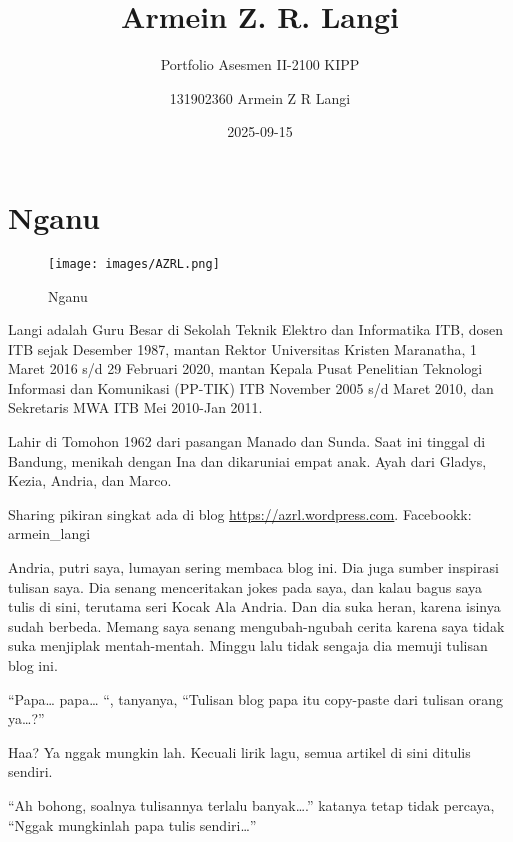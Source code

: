 \documentclass[
  letterpaper,
  DIV=11,
  numbers=noendperiod]{scrreprt}
\title{Armein Z. R. Langi}
\subtitle{Portfolio Asesmen II-2100 KIPP}
\author{131902360 Armein Z R Langi}
\date{2025-09-15}
\renewcommand*\contentsname{Table of contents}
\newcommand\contentsname{Table of contents}
\begin{document}
\maketitle

\renewcommand*\contentsname{Table of contents}
{
\hypersetup{linkcolor=}
\setcounter{tocdepth}{2}
\tableofcontents
}

\chapter*{Nganu}\label{nganu}


\begin{figure}[H]

{\centering \texttt{[image: images/AZRL.png]}

}

\caption{Nganu}

\end{figure}%

Langi adalah Guru Besar di Sekolah Teknik Elektro dan Informatika ITB,
dosen ITB sejak Desember 1987, mantan Rektor Universitas Kristen
Maranatha, 1 Maret 2016 s/d 29 Februari 2020, mantan Kepala Pusat
Penelitian Teknologi Informasi dan Komunikasi (PP-TIK) ITB November 2005
s/d Maret 2010, dan Sekretaris MWA ITB Mei 2010-Jan 2011.

Lahir di Tomohon 1962 dari pasangan Manado dan Sunda. Saat ini tinggal
di Bandung, menikah dengan Ina dan dikaruniai empat anak. Ayah dari
Gladys, Kezia, Andria, dan Marco.

Sharing pikiran singkat ada di blog \url{https://azrl.wordpress.com}.
Facebookk: armein\_langi

Andria, putri saya, lumayan sering membaca blog ini. Dia juga sumber
inspirasi tulisan saya. Dia senang menceritakan jokes pada saya, dan
kalau bagus saya tulis di sini, terutama seri Kocak Ala Andria. Dan dia
suka heran, karena isinya sudah berbeda. Memang saya senang
mengubah-ngubah cerita karena saya tidak suka menjiplak mentah-mentah.
Minggu lalu tidak sengaja dia memuji tulisan blog ini.

``Papa\ldots{} papa\ldots{} ``, tanyanya, ``Tulisan blog papa itu
copy-paste dari tulisan orang ya\ldots?''

Haa? Ya nggak mungkin lah. Kecuali lirik lagu, semua artikel di sini
ditulis sendiri.

``Ah bohong, soalnya tulisannya terlalu banyak\ldots.'' katanya tetap
tidak percaya, ``Nggak mungkinlah papa tulis sendiri\ldots{}''
\end{document}
